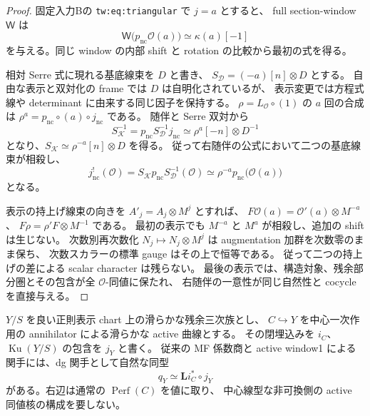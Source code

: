 \begin{proof}
固定入力Bの \texttt{tw:eq:triangular} で $j=a$ とすると、
full section-window $\mathsf W$ は
\[
 \mathsf W\bigl(p_{\mathrm{nc}}\mathcal O(a)\bigr)
       \simeq \kappa(a)[-1]
\]
を与える。同じ window の内部 shift と rotation の比較から最初の式を得る。

相対 Serre 式に現れる基底線束を $D$ と書き、
$S_{\mathcal D}=(-a)[n]\otimes D$ とする。
自由な表示と双対化の frame では $D$ は自明化されているが、
表示変更では方程式線や determinant に由来する同じ因子を保持する。
$\rho=L_{\mathcal O}\circ(1)$ の $a$ 回の合成は
$\rho^a=p_{\mathrm{nc}}\circ(a)\circ j_{\mathrm{nc}}$ である。
随伴と Serre 双対から
\[
 S_{\mathcal K}^{-1}
   =p_{\mathrm{nc}}S_{\mathcal D}^{-1}j_{\mathrm{nc}}
   \simeq\rho^a[-n]\otimes D^{-1}
\]
となり、$S_{\mathcal K}\simeq\rho^{-a}[n]\otimes D$ を得る。
従って右随伴の公式において二つの基底線束が相殺し、
\[
 j_{\mathrm{nc}}^!(\mathcal O)
 =S_{\mathcal K}p_{\mathrm{nc}}S_{\mathcal D}^{-1}(\mathcal O)
 \simeq\rho^{-a}p_{\mathrm{nc}}\bigl(\mathcal O(a)\bigr)
\]
となる。

表示の持上げ線束の向きを $A'_j=A_j\otimes M^j$ とすれば、
$F\mathcal O(a)=\mathcal O'(a)\otimes M^{-a}$、
$F\rho=\rho'F\otimes M^{-1}$ である。
最初の表示でも $M^{-a}$ と $M^a$ が相殺し、追加の shift は生じない。
次数別再次数化 $N_j\mapsto N_j\otimes M^j$ は augmentation 加群を次数零のまま保ち、
次数スカラーの標準 gauge はその上で恒等である。
従って二つの持上げの差による scalar character は残らない。
最後の表示では、構造対象、残余部分圏とその包含が全 $\mathcal O$-同値に保たれ、
右随伴の一意性が同じ自然性と cocycle を直接与える。
\end{proof}

\begin{proposition}
\label{prop:nfm-active-restriction-geometric}
$Y/S$ を良い正則表示 chart 上の滑らかな残余三次族とし、
$C\hookrightarrow Y$ を中心一次作用の annihilator による滑らかな active 曲線とする。
その閉埋込みを $i_C$、$\operatorname{Ku}(Y/S)$ の包含を $j_Y$ と書く。
従来の MF 係数商と active window1 による関手には、dg 関手として自然な同型
\begin{equation}\label{eq:nfm-q-geometric-restriction}
 q_Y\simeq\mathbf Li_C^*\circ j_Y
\end{equation}
がある。右辺は通常の $\operatorname{Perf}(C)$ を値に取り、
中心線型な非可換側の active 同値核の構成を要しない。
\end{proposition}

